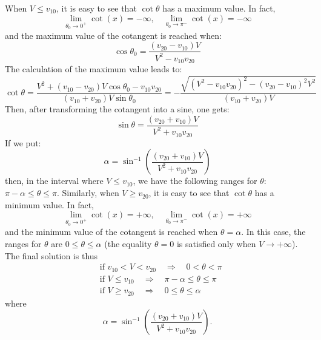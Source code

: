 \begin{problem}
{When $ V \leq v_{10} $, it is easy to see that $ \cot{\theta} $ has a maximum value. In fact,
\begin{equation*}
    \lim_{\theta_0 \to 0^+} \cot(x) = -\infty, \quad \lim_{\theta_0 \to \pi^-} \cot(x) = -\infty
\end{equation*}
and the maximum value of the cotangent is reached when:
\begin{equation*}
    \cos{\theta_0} = \frac{(v_{20} - v_{10})V}{V^2 - v_{10}v_{20}}
\end{equation*}
The calculation of the maximum value leads to:
\begin{equation*}
    \cot{\theta} = \frac{V^2 + (v_{10} - v_{20})V\cos{\theta_0} - v_{10}v_{20}}{(v_{10}+v_{20})V \sin{\theta_0}} = -\frac{\sqrt{(V^2 - v_{10}v_{20})^2 - (v_{20} - v_{10})^2 V^2}}{(v_{10} + v_{20})V}
\end{equation*}
Then, after transforming the cotangent into a sine, one gets:
\begin{equation*}
    \sin{\theta} = \frac{(v_{20} + v_{10})V}{V^2 + v_{10}v_{20}}
\end{equation*}
If we put:
\begin{equation*}
    \alpha = \sin^{-1}\left( \frac{(v_{20} + v_{10})V}{V^2 + v_{10}v_{20}} \right)
\end{equation*}
then, in the interval where $ V \leq v_{10} $, we have the following ranges for $ \theta $: $ \pi - \alpha \leq \theta \leq \pi $.
Similarly, when $ V \geq v_{20} $, it is easy to see that $ \cot{\theta} $ has a minimum value. In fact,
\begin{equation*}
    \lim_{\theta_0 \to 0^+} \cot(x) = +\infty, \quad \lim_{\theta_0 \to \pi^-} \cot(x) = +\infty
\end{equation*}
and the minimum value of the cotangent is reached when $ \theta = \alpha $. In this case, the ranges for $ \theta $ are $ 0 \leq \theta \leq \alpha $ (the equality $ \theta = 0 $ is satisfied only when $ V \to +\infty $). The final solution is thus
}
{
\begin{align*}
    &\text{if } v_{10} < V < v_{20} \quad \Rightarrow \quad 0 < \theta < \pi \\
    &\text{if } V \leq v_{10} \quad \Rightarrow \quad \pi - \alpha \leq \theta \leq \pi \\
    &\text{if } V \geq v_{20} \quad \Rightarrow \quad 0 \leq \theta \leq \alpha
\end{align*}
where
\begin{equation*}
    \alpha = \sin^{-1} \left( \frac{(v_{20} + v_{10})V}{V^2 + v_{10}v_{20}} \right).
\end{equation*}
}
\end{problem}


